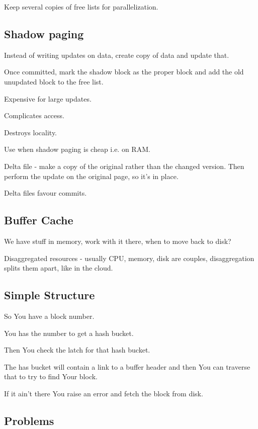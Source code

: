 \documentclass{article}
\begin{document}
			Keep several copies of free lists for parallelization.
			
		\subsection{Shadow paging}
		
			Instead of writing updates on data, create copy of data and update that.
			
			Once committed, mark the shadow block as the proper block and add the old unupdated block to the free list.
			
			Expensive for large updates.
			
			Complicates access.
			
			Destroys locality.
			
			Use when shadow paging is cheap i.e. on RAM.
			
			Delta file - make a copy of the original rather than the changed version. Then perform the update on the original page, so it's in place.
			
			Delta files favour commits.
			
		\subsection{Buffer Cache}
		
			We have stuff in memory, work with it there, when to move back to disk?
			
			Disaggregated resources - usually CPU, memory, disk are couples, disaggregation splits them apart, like in the cloud.
			
		\subsection{Simple Structure}
		
			So You have a block number.
			
			You has the number to get a hash bucket.
			
			Then You check the latch for that hash bucket.
			
			The has bucket will contain a link to a buffer header and then You can traverse that to try to find Your block.
			
			If it ain't there You raise an error and fetch the block from disk.
			
		\subsection{Problems}
			
\end{document}
